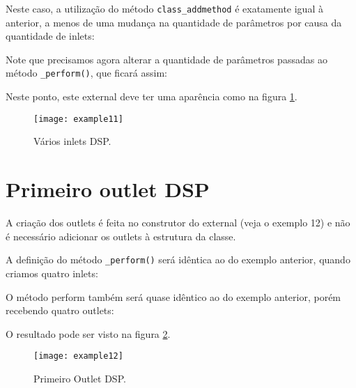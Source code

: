 

Neste caso, a utilização do método \texttt{class\_addmethod} é exatamente
igual à anterior, a menos de uma mudança na quantidade de parâmetros por causa
da quantidade de inlets:



Note que precisamos agora alterar a quantidade de parâmetros passadas ao método
\texttt{\_perform()}, que ficará assim:



Neste ponto, este external deve ter uma aparência como na figura
\ref{fig:inlets-dsp}.

\begin{figure}[h!]
\centering
\texttt{[image: example11]}
\caption{Vários inlets DSP.}
\label{fig:inlets-dsp}
\end{figure}

\section{Primeiro outlet DSP}

A criação dos outlets é feita no construtor do external (veja o exemplo 12) e
não é necessário adicionar os outlets à estrutura da classe.



A definição do método \texttt{\_perform()} será idêntica ao do exemplo
anterior, quando criamos quatro inlets:



O método perform também será quase idêntico ao do exemplo anterior, porém
recebendo quatro outlets:



O resultado pode ser visto na figura \ref{fig:primeiro-outlet}.

\begin{figure}[h!]
\centering
\texttt{[image: example12]}
\caption{Primeiro Outlet DSP.}
\label{fig:primeiro-outlet}
\end{figure}

